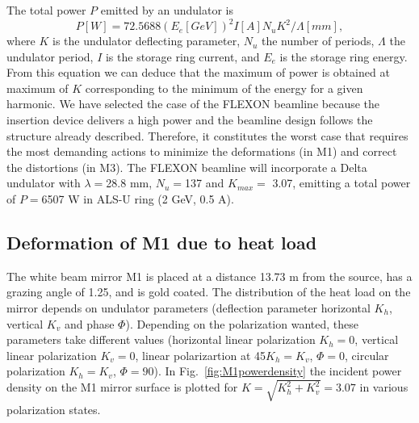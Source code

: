 \documentclass[preprint]{iucr}              %
\newcommand{\todo}[1]{{\color{red}[TODO: "#1'']}}
\begin{document}
The total power $P$ emitted by an undulator is 
\begin{equation}
    P [W] = 72.5688  (E_e [GeV])^2  I[A]  N_u  K^2 / \Lambda[mm],
\end{equation}
where $K$ is the undulator deflecting parameter, $N_u$ the number of periods, $\Lambda$ the undulator period, $I$ is the storage ring current, and $E_e$ is the storage ring energy. From this equation we can deduce that the maximum of power is obtained at maximum of $K$ corresponding to the minimum of the energy for a given harmonic.  We have selected the case of the FLEXON beamline because the insertion device delivers a high power and the beamline design follows the structure already described. Therefore, it constitutes the worst case that requires the most demanding actions to minimize the deformations (in M1) and correct the distortions (in M3). The FLEXON beamline will incorporate a Delta undulator \cite{deltaundulator} with $\lambda=$28.8 mm, $N_u=$137 and $K_{max}=$ 3.07, emitting a total power of $P=$6507 W in ALS-U ring (2 GeV,  0.5 A).

\subsection{Deformation of M1 due to heat load}


The white beam mirror M1 is placed at a distance 13.73 m from the source, has a grazing angle of 1.25\textdegree, and is gold coated. The distribution of the heat load on the mirror depends on undulator parameters (deflection parameter horizontal $K_h$, vertical $K_v$ and phase $\Phi$). Depending on the polarization wanted, these parameters take different values (horizontal linear polarization $K_h=0$, vertical linear polarization $K_v=0$, linear polarizartion at 45\textdegree $K_h=K_v$, $\Phi=0$, circular polarization $K_h=K_v$, $\Phi=90$\textdegree ). In Fig.~\ref{fig:M1powerdensity} the incident power density on the M1 mirror surface is plotted for $K=\sqrt{K_h^2 + K_v^2}=3.07$ in various polarization states.
\end{document}
